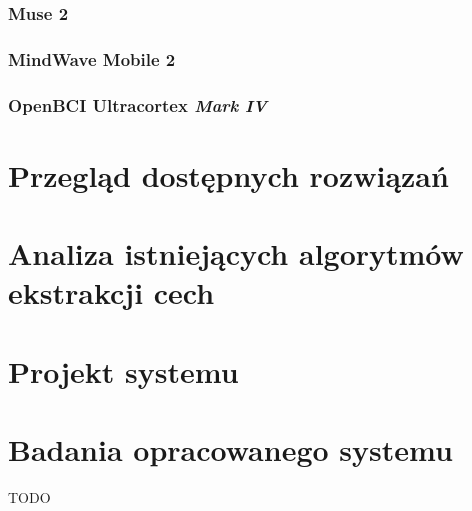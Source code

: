 \documentclass[skorowidz,skroty]{dyplomWEZUT}
\begin{document}
\subsection{Muse 2}
\subsection{MindWave Mobile 2}
\subsection{OpenBCI Ultracortex \textit{Mark IV}}

\chapter{Przegląd dostępnych rozwiązań}

\chapter{Analiza istniejących algorytmów ekstrakcji cech}

\chapter{Projekt systemu}

\chapter{Badania opracowanego systemu}



\begin{zakonczenie}\label{chap:zakonczenie}
TODO
\end{zakonczenie}

\printbibliography[heading=bibintoc]

\listoftables

\listoffigures

\listoflistings


\printindex
\end{document}
